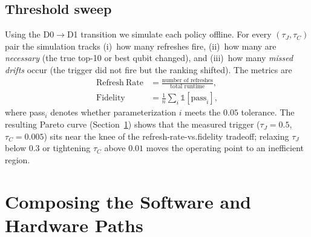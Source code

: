 \documentclass[journal,10pt,twocolumn]{IEEEtran}
\begin{document}
\subsection{Threshold sweep}
\label{sec:sweep}
Using the D0$\to$D1 transition we simulate each policy offline. For every $(\tau_J, \tau_C)$ pair the simulation
tracks (i)~how many refreshes fire, (ii)~how many are \emph{necessary} (the true top-10 or best qubit changed),
and (iii)~how many \emph{missed drifts} occur (the trigger did not fire but the ranking shifted). The metrics are
\begin{equation}\begin{aligned}
\mathrm{Refresh\ Rate} &= \frac{\text{number of refreshes}}{\text{total runtime}},\\
\mathrm{Fidelity} &= \frac{1}{n}\sum_i \mathbb{1}[\text{pass}_i],
\end{aligned}\label{eq:sweep}
\end{equation}
where pass$_i$ denotes whether parameterization $i$ meets the $0.05$ tolerance. The resulting Pareto curve
(Section~\ref{sec:e2e}) shows that the measured trigger ($\tau_J{=}0.5$, $\tau_C{=}0.005$) sits near the knee of
the refresh-rate-vs.\-fidelity tradeoff; relaxing $\tau_J$ below $0.3$ or tightening $\tau_C$ above $0.01$
moves the operating point to an inefficient region.

\section{Composing the Software and Hardware Paths}
\label{sec:e2e}
\end{document}
